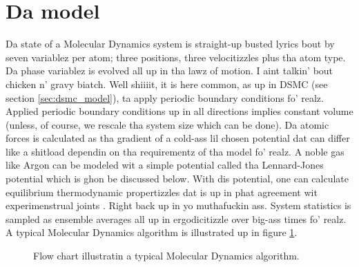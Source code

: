 \section{Da model}
\label{sec:md_model}
Da state of a Molecular Dynamics system is straight-up busted lyrics bout by seven variablez per atom; three positions, three velocitizzles plus tha atom type. Da phase variablez is evolved all up in tha lawz of motion. I aint talkin' bout chicken n' gravy biatch. Well shiiiit, it is here common, as up in DSMC (see section \ref{sec:dsmc_model}), ta apply periodic boundary conditions fo' realz. Applied periodic boundary conditions up in all directions implies constant volume (unless, of course, we rescale tha system size which can be done). Da atomic forces is calculated as tha gradient of a cold-ass lil chosen potential dat can differ like a shitload dependin on tha requirementz of tha model fo' realz. A noble gas like Argon can be modeled wit a simple potential called tha Lennard-Jones potential which is ghon be discussed below. With dis potential, one can calculate equilibrium thermodynamic propertizzles dat is up in phat agreement wit experimenstrual joints \cite{verlet1967computer}. Right back up in yo muthafuckin ass. System statistics is sampled as ensemble averages all up in ergodicitizzle over big-ass times fo' realz. A typical Molecular Dynamics algorithm is illustrated up in figure \ref{fig:flow_simple_md}.
\begin{figure}[h]
\centering
\caption{Flow chart illustratin a typical Molecular Dynamics algorithm.}
\label{fig:flow_simple_md}
\end{figure}